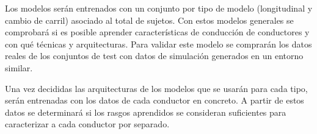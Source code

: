 Los modelos serán entrenados con un conjunto por tipo de modelo (longitudinal y cambio de carril) asociado al total de sujetos. Con estos modelos generales se comprobará si es posible aprender características de conducción de conductores y con qué técnicas y arquitecturas. Para validar este modelo se comprarán los datos reales de los conjuntos de test con datos de simulación generados en un entorno similar.

Una vez decididas las arquitecturas de los modelos que se usarán para cada tipo, serán entrenadas con los datos de cada conductor en concreto. A partir de estos datos se determinará si los rasgos aprendidos se consideran suficientes para caracterizar a cada conductor por separado.
